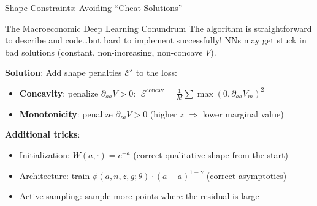 \documentclass[aspectratio=169,11pt]{beamer}
\newcommand{\emphc}[1]{\textcolor{harvardcrimson}{#1}}
\newcommand{\ubar}[1]{\underline{#1}}
\begin{document}
\begin{frame}{Shape Constraints: Avoiding ``Cheat Solutions''}
\begin{alertblock}{The Macroeconomic Deep Learning Conundrum}
\footnotesize
The algorithm is straightforward to describe and code\ldots but \emphc{hard to implement successfully!}
NNs may get stuck in bad solutions (constant, non-increasing, non-concave $V$).
\end{alertblock}

\vspace{0.1em}
\small
\textbf{Solution}: Add \emphc{shape penalties} $\mathcal{E}^s$ to the loss:
\begin{itemize}\itemsep0pt
    \item \textbf{Concavity}: penalize $\partial_{aa}V > 0$: $\;\mathcal{E}^{\text{concav}} = \frac{1}{M}\sum \max(0, \partial_{aa}V_m)^2$
    \item \textbf{Monotonicity}: penalize $\partial_{za}V > 0$ (higher $z$ $\Rightarrow$ lower marginal value)
\end{itemize}

\vspace{0.1em}
\textbf{Additional tricks}:
\begin{itemize}\itemsep0pt
    \item \emphc{Initialization}: $W(a, \cdot) = e^{-a}$ (correct qualitative shape from the start)
    \item \emphc{Architecture}: train $\phi(a,n,z,g;\theta)\cdot(a-\ubar{a})^{1-\gamma}$ (correct asymptotics)
    \item \emphc{Active sampling}: sample more points where the residual is large
\end{itemize}
\end{frame}
\end{document}
